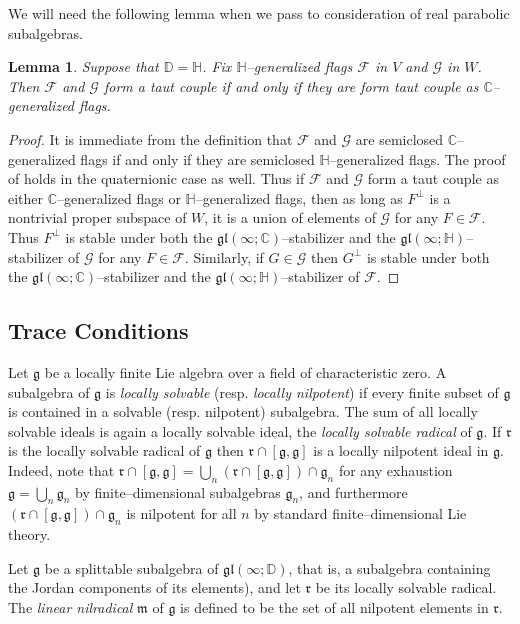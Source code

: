 \documentclass[oneside,leqno,11pt]{article}
\def\gg{\mathfrak{g}}
\def\ggl{\mathfrak{gl}}
\def\gm{\mathfrak{m}}
\def\gr{\mathfrak{r}}
\def\C{\mathbb{C}}
\def\D{\mathbb{D}}
\def\H{\mathbb{H}}
\def\cF{\mathcal{F}}
\def\cG{\mathcal{G}}
\newtheorem{lemma}[equation]{Lemma}
\begin{document}
We will need the following lemma when we pass to consideration of real parabolic
subalgebras.


\begin{lemma}\label{F-independent}
Suppose that $\D = \H$.  Fix $\H$--generalized flags $\cF$ in $V$ and $\cG$ in $W$.  Then $\cF$ and $\cG$ form a taut couple if and only if they are form taut couple as $\C$--generalized flags.
\end{lemma}


\begin{proof}
It is immediate from the definition that $\cF$ and $\cG$ are semiclosed $\C$--generalized flags if and only if they are semiclosed $\H$--generalized flags.  The proof of \cite[Proposition 3.2]{DC2} holds in the quaternionic
case as well.  Thus if $\cF$ and $\cG$ form a taut couple as either $\C$--generalized flags or $\H$--generalized flags, 
then as long as $F^\perp$ is a nontrivial proper subspace of $W$, it is a union of
elements of $\cG$ for any $F \in \cF$.
Thus $F^\perp$ is stable under both the $\ggl(\infty;\C)$--stabilizer and the $\ggl(\infty;\H)$--stabilizer
of $\cG$ for any $F \in \cF$.  Similarly, if $G \in \cG$ then $G^\perp$ is stable under
both the $\ggl(\infty;\C)$--stabilizer and the $\ggl(\infty;\H)$--stabilizer of $\cF$.  
\end{proof}


\subsection{Trace Conditions}


Let $\gg$ be a locally finite Lie algebra over a field of characteristic
zero.  A subalgebra
of $\gg$ is {\em locally solvable} (resp. {\em locally nilpotent})
if every finite subset of $\gg$ is contained in a solvable (resp. nilpotent)
subalgebra.  The sum of all locally solvable ideals is again a locally
solvable ideal, the {\em locally solvable radical} of $\gg$.  If $\gr$ is the
locally solvable radical of $\gg$ then 
$\gr \cap [\gg,\gg]$ is a locally nilpotent ideal in $\gg$.
Indeed, note that
$\gr \cap [\gg,\gg] = \bigcup_n (\gr \cap [\gg,\gg])\cap \gg_n$
for any exhaustion $\gg = \bigcup_n \gg_n$ by finite--dimensional subalgebras $\gg_n$,
and furthermore $(\gr \cap [\gg,\gg])\cap \gg_n$ is nilpotent for all $n$ by standard
finite--dimensional Lie theory.

Let $\gg$ be a splittable subalgebra of $\ggl(\infty;\D)$, that is, a 
subalgebra containing the Jordan components of its elements), and let 
$\gr$ be 
its locally solvable radical.  The {\em linear nilradical} $\gm$ of $\gg$
is defined to be the set of all nilpotent elements in $\gr$.  
\end{document}
